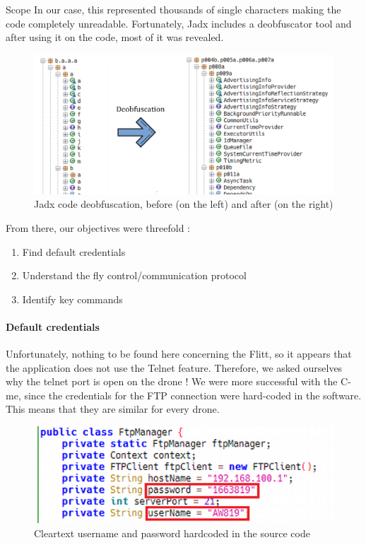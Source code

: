 \begin{chaptercover}{Scope}
In our case, this represented thousands of single characters making the code completely unreadable. Fortunately, Jadx includes a deobfuscator tool and after using it on the code, most of it was revealed.

\begin{figure}[H]
  \centering
  \includegraphics[width=.8\linewidth]{figures/apk-source-deobfuscation}
  \caption{Jadx code deobfuscation, before (on the left) and after (on the right)}
\end{figure}

From there, our objectives were threefold :

\begin{enumerate}
  \item Find default credentials
  \item Understand the fly control/communication protocol
  \item Identify key commands
\end{enumerate}

\paragraph{Default credentials} Unfortunately, nothing to be found here concerning the Flitt, so it appears that the application does not use the Telnet feature. Therefore, we asked ourselves why the telnet port is open on the drone ! We were more successful with the C-me, since the credentials for the FTP connection were hard-coded in the software. This means that they are similar for every drone.

\begin{figure}[H]
  \centering
  \includegraphics[width=.5\linewidth]{figures/apk-source-with-password}
  \caption{Cleartext username and password hardcoded in the source code}
\end{figure}


\end{chaptercover}
